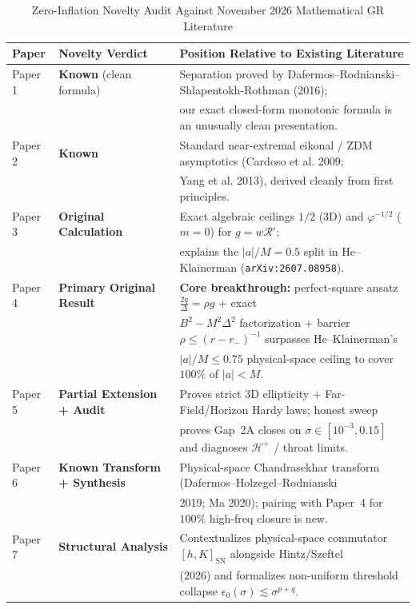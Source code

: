 \documentclass[11pt, a4paper]{article}
\theoremstyle{remark}
\begin{document}
\begin{table}[h]
\centering
\caption{Zero-Inflation Novelty Audit Against November 2026 Mathematical GR Literature}
\label{tab:novelty-audit}
\begin{tabular}{@{}lll@{}}
\toprule
\textbf{Paper} & \textbf{Novelty Verdict} & \textbf{Position Relative to Existing Literature} \\
\midrule
Paper 1 & \textbf{Known} (clean formula) & Separation proved by Dafermos--Rodnianski--Shlapentokh-Rothman (2016); \\
 & & our exact closed-form monotonic formula is an unusually clean presentation. \\
\addlinespace[4pt]
Paper 2 & \textbf{Known} & Standard near-extremal eikonal / ZDM asymptotics (Cardoso et al. 2009; \\
 & & Yang et al. 2013), derived cleanly from first principles. \\
\addlinespace[4pt]
Paper 3 & \textbf{Original Calculation} & Exact algebraic ceilings $1/2$ (3D) and $\varphi^{-1/2}$ ($m=0$) for $g = w\mathcal{R}'$; \\
 & & explains the $|a|/M = 0.5$ split in He--Klainerman (\texttt{arXiv:2607.08958}). \\
\addlinespace[4pt]
Paper 4 & \textbf{Primary Original Result} & \textbf{Core breakthrough:} perfect-square ansatz $\frac{2q}{\Delta} = \rho g$ + exact \\
 & & $B^2 - M^2\Delta^2$ factorization + barrier $\rho \le (r-r_-)^{-1}$ surpasses He--Klainerman's \\
 & & $|a|/M \le 0.75$ physical-space ceiling to cover $100\%$ of $|a| < M$. \\
\addlinespace[4pt]
Paper 5 & \textbf{Partial Extension + Audit} & Proves strict 3D ellipticity + Far-Field/Horizon Hardy laws; honest sweep \\
 & & proves Gap~2A closes on $\sigma \in [10^{-3}, 0.15]$ and diagnoses $\mathcal{H}^+$ / throat limits. \\
\addlinespace[4pt]
Paper 6 & \textbf{Known Transform + Synthesis} & Physical-space Chandrasekhar transform (Dafermos--Holzegel--Rodnianski \\
 & & 2019; Ma 2020); pairing with Paper~4 for $100\%$ high-freq closure is new. \\
\addlinespace[4pt]
Paper 7 & \textbf{Structural Analysis} & Contextualizes physical-space commutator $[h, K]_{\mathrm{SN}}$ alongside Hintz/Szeftel \\
 & & (2026) and formalizes non-uniform threshold collapse $\epsilon_0(\sigma) \lesssim \sigma^{p+q}$. \\
\bottomrule
\end{tabular}
\end{table}
\end{document}
